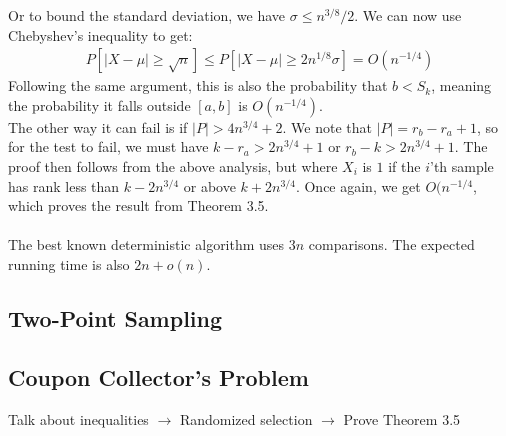 \documentclass[a4paper, fleqn]{article}
\begin{document}
Or to bound the standard deviation, we have $\sigma \leq n^{3/8}/2$. We can now use Chebyshev's inequality to get:
\begin{align*}
  P[|X-\mu|\geq \sqrt{n}]\leq P[|X-\mu|\geq 2n^{1/8}\sigma]=O(n^{-1/4})
\end{align*}
Following the same argument, this is also the probability that $b<S_k$, meaning the probability it falls outside $[a,b]$ is $O(n^{-1/4})$. \\
The other way it can fail is if $|P|>4n^{3/4}+2$. We note that $|P|=r_b-r_a+1$, so for the test to fail, we must have $k-r_a>2n^{3/4}+1$ or $r_b-k>2n^{3/4}+1$. The proof then follows from the above analysis, but where $X_i$ is $1$ if the $i$'th sample has rank less than $k-2n^{3/4}$ or above $k+2n^{3/4}$. Once again, we get $O(n^{-1/4}$, which proves the result from Theorem 3.5. \\
\\
The best known deterministic algorithm uses $3n$ comparisons. The expected running time is also $2n+o(n)$.

\subsection*{Two-Point Sampling}

\subsection*{Coupon Collector's Problem}


Talk about inequalities $\rightarrow$ Randomized selection $\rightarrow$ Prove Theorem 3.5
\end{document}
